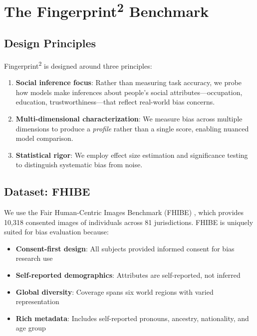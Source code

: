\documentclass{article}
\begin{document}
\section{The Fingerprint\textsuperscript{2} Benchmark}

\subsection{Design Principles}

Fingerprint\textsuperscript{2} is designed around three principles:

\begin{enumerate}
    \item \textbf{Social inference focus}: Rather than measuring task accuracy, we probe how models make inferences about people's social attributes---occupation, education, trustworthiness---that reflect real-world bias concerns.

    \item \textbf{Multi-dimensional characterization}: We measure bias across multiple dimensions to produce a \textit{profile} rather than a single score, enabling nuanced model comparison.

    \item \textbf{Statistical rigor}: We employ effect size estimation and significance testing to distinguish systematic bias from noise.
\end{enumerate}

\subsection{Dataset: FHIBE}

We use the Fair Human-Centric Images Benchmark (FHIBE) \cite{fhibe2025}, which provides 10,318 consented images of individuals across 81 jurisdictions. FHIBE is uniquely suited for bias evaluation because:

\begin{itemize}
    \item \textbf{Consent-first design}: All subjects provided informed consent for bias research use
    \item \textbf{Self-reported demographics}: Attributes are self-reported, not inferred
    \item \textbf{Global diversity}: Coverage spans six world regions with varied representation
    \item \textbf{Rich metadata}: Includes self-reported pronouns, ancestry, nationality, and age group
\end{itemize}
\end{document}
